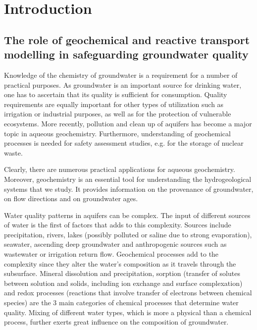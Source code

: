 

\chapter{Introduction}
\def\shorttitle{Introduction} %


\section{The role of geochemical and reactive transport modelling in safeguarding groundwater quality}

Knowledge of the chemistry of groundwater is a requirement for a number of practical purposes. As groundwater is an important source for drinking water, one has to ascertain that its quality is sufficient for consumption. Quality requirements are equally important for other types of utilization such as irrigation or industrial purposes, as well as for the protection of vulnerable ecosystems. More recently, pollution and clean up of aquifers has become a major topic in aqueous geochemistry. Furthermore, understanding of geochemical processes is needed for safety assessment studies, e.g. for the storage of nuclear waste.

Clearly, there are numerous practical applications for aqueous geochemistry. Moreover, geochemistry is an essential tool for understanding the hydrogeological systems that we study. It provides information on the provenance of groundwater, on flow directions and on groundwater ages.

Water quality patterns in aquifers can be complex. The input of different sources of water is the first of factors that adds to this complexity. Sources include precipitation, rivers, lakes (possibly polluted or saline due to strong evaporation), seawater, ascending deep groundwater and anthropogenic sources such as wastewater or irrigation return flow. Geochemical processes add to the complexity since they alter the water's composition as it travels through the subsurface. 
Mineral dissolution and precipitation, 
sorption (transfer of solutes between solution and solids, including ion exchange and surface complexation)
and redox processes (reactions that involve transfer of electrons between chemical species) 
are the 3 main categories of chemical processes 
that determine water quality. Mixing of different water types, which is more a physical than a chemical process, further exerts great influence on the composition of groundwater.

